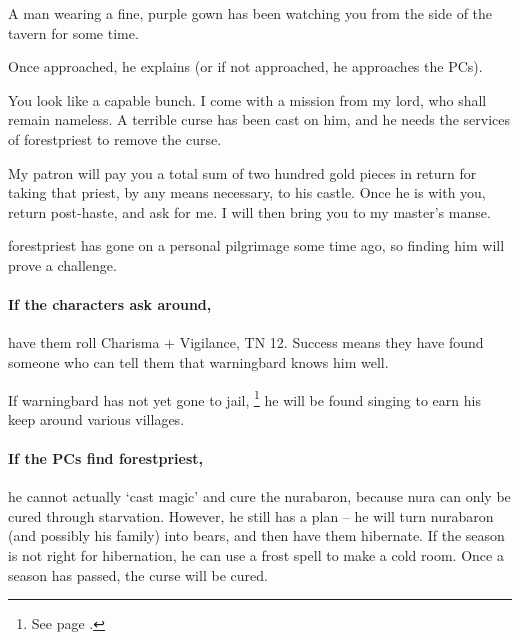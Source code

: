 \begin{multicols}{2}
\stopcontents[Town]

\begin{boxtext}

  A man wearing a fine, purple gown has been watching you from the side of the tavern for some time.

\end{boxtext}

Once approached, he explains (or if not approached, he approaches the PCs).

\begin{speechtext}

  You look like a capable bunch.
  I come with a mission from my lord, who shall remain nameless.
  A terrible curse has been cast on him, and he needs the services of \gls{forestpriest} to remove the curse.

  My patron will pay you a total sum of two hundred gold pieces in return for taking that priest, by any means necessary, to his castle.
  Once he is with you, return post-haste, and ask for me.
  I will then bring you to my master's manse.

\end{speechtext}

\Gls{forestpriest} has gone on a personal pilgrimage some time ago, so finding him will prove a challenge.

\paragraph{If the characters ask around,}
have them roll Charisma + Vigilance, TN 12.
Success means they have found someone who can tell them that \gls{warningbard} knows him well.

If \gls{warningbard} has not yet gone to jail,%
\footnote{See page \pageref{warningbard}.}
he will be found singing to earn his keep around various villages.

\paragraph{If the PCs find \gls{forestpriest},}
he cannot actually `cast magic' and cure the \gls{nurabaron}, because nura can only be cured through starvation.
However, he still has a plan -- he will turn \gls{nurabaron} (and possibly his family) into bears, and then have them hibernate.
If the season is not right for hibernation, he can use a frost spell to make a cold room.
Once a season has passed, the curse will be cured.


\end{multicols}
